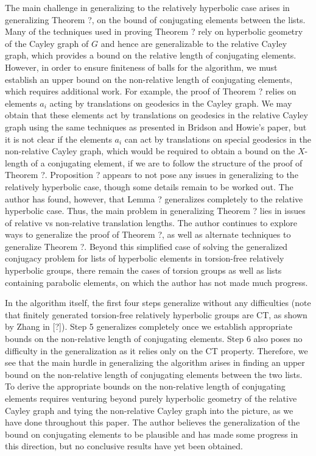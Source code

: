\documentclass[12pt]{article}
\newcommand{\vs}{\vskip10pt}
\begin{document}
	The main challenge in generalizing to the relatively hyperbolic case arises in generalizing Theorem ?, on the bound of conjugating elements between the lists. Many of the techniques used in proving Theorem ? rely on hyperbolic geometry of the Cayley graph of $G$ and hence are generalizable to the relative Cayley graph, which provides a bound on the relative length of conjugating elements. However, in order to ensure finiteness of balls for the algorithm, we must establish an upper bound on the non-relative length of conjugating elements, which requires additional work. For example, the proof of Theorem ? relies on elements $a_i$ acting by translations on geodesics in the Cayley graph. We may obtain that these elements act by translations on geodesics in the relative Cayley graph using the same techniques as presented in Bridson and Howie's paper, but it is not clear if the elements $a_i$ can act by translations on special geodesics in the non-relative Cayley graph, which would be required to obtain a bound on the $X$-length of a conjugating element, if we are to follow the structure of the proof of Theorem ?. Proposition ? appears to not pose any issues in generalizing to the relatively hyperbolic case, though some details remain to be worked out. The author has found, however, that Lemma ? generalizes completely to the relative hyperbolic case. Thus, the main problem in generalizing Theorem ? lies in issues of relative vs non-relative translation lengths. The author continues to explore ways to generalize the proof of Theorem ?, as well as alternate techniques to generalize Theorem ?. Beyond this simplified case of solving the generalized conjugacy problem for lists of hyperbolic elements in torsion-free relatively hyperbolic groups, there remain the cases of torsion groups as well as lists containing parabolic elements, on which the author has not made much progress. 
	
	\vs 
	
	In the algorithm itself, the first four steps generalize without any difficulties (note that finitely generated torsion-free relatively hyperbolic groups are CT, as shown by Zhang in [?]). Step 5 generalizes completely once we establish appropriate bounds on the non-relative length of conjugating elements. Step 6 also poses no difficulty in the generalization as it relies only on the CT property. Therefore, we see that the main hurdle in generalizing the algorithm arises in finding an upper bound on the non-relative length of conjugating elements between the two lists. To derive the appropriate bounds on the non-relative length of conjugating elements requires venturing beyond purely hyperbolic geometry of the relative Cayley graph and tying the non-relative Cayley graph into the picture, as we have done throughout this paper. The author believes the generalization of the bound on conjugating elements to be plausible and has made some progress in this direction, but no conclusive results have yet been obtained. 
	
\end{document}
